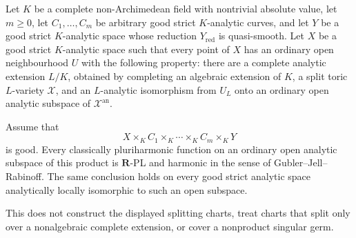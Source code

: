 
\begin{corollary}
\label{cor:p061-analytic-toric-arbitrary-curve-factor-products}
Let $K$ be a complete non-Archimedean field with nontrivial absolute
value, let $m\geq0$, let $C_1,\ldots,C_m$ be arbitrary good strict
$K$-analytic curves, and let $Y$ be a good strict $K$-analytic space whose
reduction $Y_{\mathrm{red}}$ is quasi-smooth.  Let $X$ be a good strict
$K$-analytic space such that every point of $X$ has an ordinary open
neighbourhood $U$ with the following property: there are a complete
analytic extension $L/K$, obtained by completing an algebraic extension of
$K$, a split toric $L$-variety $\mathcal X$, and an $L$-analytic
isomorphism from $U_L$ onto an ordinary open analytic subspace of
$\mathcal X^{\mathrm{an}}$.

Assume that
\[
 X\times_K C_1\times_K\cdots\times_K C_m\times_KY
\]
is good.  Every classically pluriharmonic function on an ordinary open
analytic subspace of this product is $\mathbf R$-PL and harmonic in the
sense of Gubler--Jell--Rabinoff.  The same conclusion holds on every good
strict analytic space analytically locally isomorphic to such an open
subspace.

This does not construct the displayed splitting charts, treat charts that
split only over a nonalgebraic complete extension, or cover a nonproduct
singular germ.
\end{corollary}
